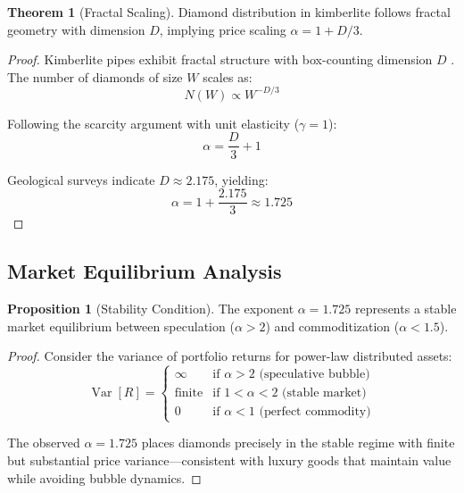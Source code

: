 \documentclass[12pt,a4paper]{article}
\DeclareMathOperator{\Var}{Var}
\theoremstyle{definition}
\newtheorem{theorem}{Theorem}
\newtheorem{proposition}{Proposition}
\theoremstyle{remark}
\begin{document}
\begin{theorem}[Fractal Scaling]
Diamond distribution in kimberlite follows fractal geometry with dimension $D$, implying price scaling $\alpha = 1 + D/3$.
\end{theorem}

\begin{proof}
Kimberlite pipes exhibit fractal structure with box-counting dimension $D$ \citep{mandelbrot1982fractal}. The number of diamonds of size $W$ scales as:
\begin{equation}
N(W) \propto W^{-D/3}
\end{equation}

Following the scarcity argument with unit elasticity ($\gamma = 1$):
\begin{equation}
\alpha = \frac{D}{3} + 1
\end{equation}

Geological surveys indicate $D \approx 2.175$, yielding:
\begin{equation}
\alpha = 1 + \frac{2.175}{3} \approx 1.725
\end{equation}
\end{proof}

\subsection{Market Equilibrium Analysis}

\begin{proposition}[Stability Condition]
The exponent $\alpha = 1.725$ represents a stable market equilibrium between speculation ($\alpha > 2$) and commoditization ($\alpha < 1.5$).
\end{proposition}

\begin{proof}
Consider the variance of portfolio returns for power-law distributed assets:
\begin{equation}
\Var[R] = \begin{cases}
\infty & \text{if } \alpha > 2 \text{ (speculative bubble)} \\
\text{finite} & \text{if } 1 < \alpha < 2 \text{ (stable market)} \\
0 & \text{if } \alpha < 1 \text{ (perfect commodity)}
\end{cases}
\end{equation}

The observed $\alpha = 1.725$ places diamonds precisely in the stable regime with finite but substantial price variance—consistent with luxury goods that maintain value while avoiding bubble dynamics.
\end{proof}
\end{document}
